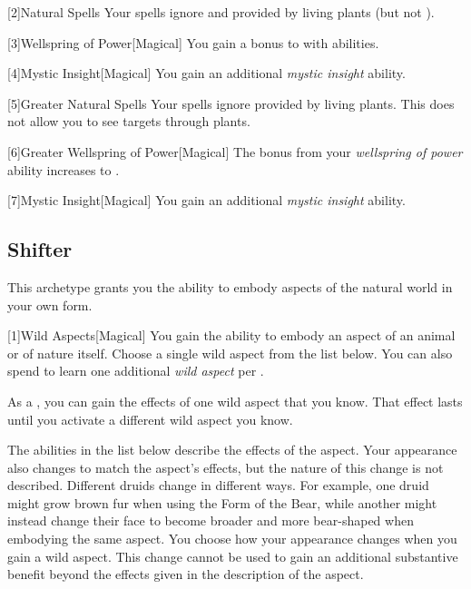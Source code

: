         [2]{Natural Spells} Your spells ignore  and  provided by living plants (but not ).

        [3]{Wellspring of Power}[Magical]
        You gain a  bonus to  with  abilities.

        [4]{Mystic Insight}[Magical]
        You gain an additional \textit{mystic insight} ability.

        [5]{Greater Natural Spells} Your spells ignore  provided by living plants.
        This does not allow you to see targets through plants.

        [6]{Greater Wellspring of Power}[Magical]
        The bonus from your \textit{wellspring of power} ability increases to .

        [7]{Mystic Insight}[Magical]
        You gain an additional \textit{mystic insight} ability.

    \subsection{Shifter}\label{Shifter}
        This archetype grants you the ability to embody aspects of the natural world in your own form.

        [1]{Wild Aspects}[Magical]
        You gain the ability to embody an aspect of an animal or of nature itself.
        Choose a single wild aspect from the list below.
        You can also spend  to learn one additional \textit{wild aspect} per .

        As a , you can gain the effects of one wild aspect that you know.
        That effect lasts until you activate a different wild aspect you know.

        The abilities in the list below describe the effects of the aspect.
        Your appearance also changes to match the aspect's effects, but the nature of this change is not described.
        Different druids change in different ways.
        For example, one druid might grow brown fur when using the Form of the Bear, while another might instead change their face to become broader and more bear-shaped when embodying the same aspect.
        You choose how your appearance changes when you gain a wild aspect.
        This change cannot be used to gain an additional substantive benefit beyond the effects given in the description of the aspect.

